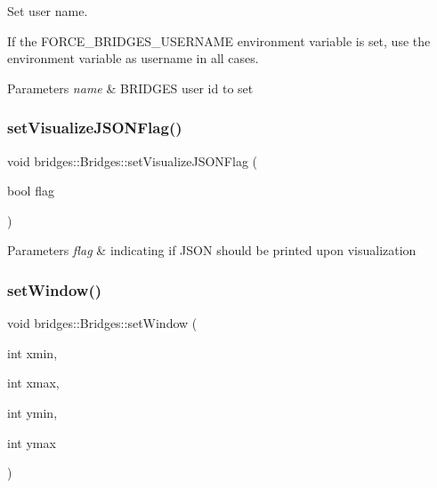 Set user name. 

If the F\+O\+R\+C\+E\+\_\+\+B\+R\+I\+D\+G\+E\+S\+\_\+\+U\+S\+E\+R\+N\+A\+ME environment variable is set, use the environment variable as username in all cases.


\begin{DoxyParams}{Parameters}
{\em name} & B\+R\+I\+D\+G\+ES user id to set \\
\hline
\end{DoxyParams}
\mbox{\label{classbridges_1_1_bridges_a69aca37ab2729d0345e0549d7baf0423}} 
\subsubsection{\texorpdfstring{setVisualizeJSONFlag()}{setVisualizeJSONFlag()}}
{\footnotesize\ttfamily void bridges\+::\+Bridges\+::set\+Visualize\+J\+S\+O\+N\+Flag (\begin{DoxyParamCaption}\item[{bool}]{flag }\end{DoxyParamCaption})\hspace{0.3cm}{\ttfamily [inline]}}


\begin{DoxyParams}{Parameters}
{\em flag} & indicating if J\+S\+ON should be printed upon visualization \\
\hline
\end{DoxyParams}
\mbox{\label{classbridges_1_1_bridges_a0465bca83056a72ba4db82b60e622163}} 
\subsubsection{\texorpdfstring{setWindow()}{setWindow()}\hspace{0.1cm}{\footnotesize\ttfamily [1/2]}}
{\footnotesize\ttfamily void bridges\+::\+Bridges\+::set\+Window (\begin{DoxyParamCaption}\item[{int}]{xmin,  }\item[{int}]{xmax,  }\item[{int}]{ymin,  }\item[{int}]{ymax }\end{DoxyParamCaption})\hspace{0.3cm}{\ttfamily [inline]}}

